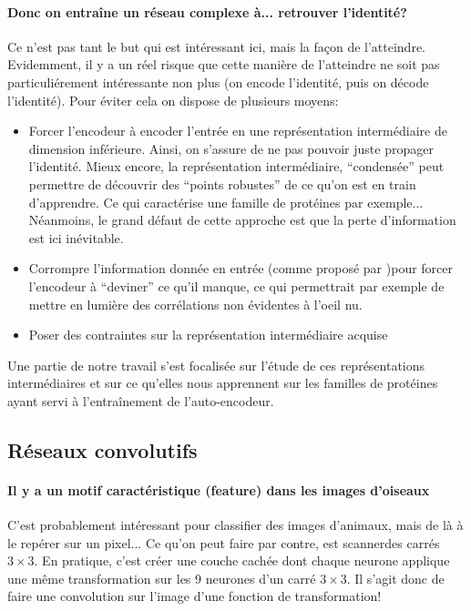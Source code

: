 \documentclass[a4paper,11pt]{article}
\begin{document}
\paragraph{Donc on entraîne un réseau complexe à... retrouver l'identité?}

Ce n'est pas tant le but qui est intéressant ici, mais la façon de l'atteindre.
Evidemment, il y a un réel risque que cette manière de l'atteindre ne soit pas
particuliérement intéressante non plus (on encode l'identité, puis on décode
l'identité). Pour éviter cela on dispose de plusieurs moyens:

\begin{itemize}
\item Forcer l'encodeur à encoder l'entrée en une représentation intermédiaire
  de dimension inférieure. Ainsi, on s'assure de ne pas pouvoir juste propager
  l'identité. Mieux encore, la représentation intermédiaire, ``condensée'' peut
  permettre de découvrir des ``points robustes'' de ce qu'on est en train
  d'apprendre. Ce qui caractérise une famille de protéines par exemple...
  Néanmoins, le grand défaut de cette approche est que la perte d'information
  est ici inévitable.
\item Corrompre l'information donnée en entrée (comme proposé par \cite{Vincent:2008:ECR:1390156.1390294})pour forcer l'encodeur à
  ``deviner'' ce qu'il manque, ce qui permettrait par exemple de mettre en
  lumière des corrélations non évidentes à l'oeil nu.
\item Poser des contraintes sur la représentation intermédiaire acquise

\end{itemize}

Une partie de notre travail s'est focalisée sur l'étude de ces représentations
intermédiaires et sur ce qu'elles nous apprennent sur les familles de protéines
ayant servi à l'entraînement de l'auto-encodeur.

\subsection{Réseaux convolutifs}

\paragraph{Il y a un motif caractéristique (feature) dans les images d'oiseaux}

C'est probablement intéressant pour classifier des images d'animaux, mais de là
à le repérer sur un pixel... Ce qu'on peut faire par contre, est \og
scanner\fg des carrés $3\times 3$. En pratique, c'est créer une couche cachée
dont chaque neurone applique une même transformation sur les 9 neurones d'un
carré $3\times 3$. Il s'agit donc de faire une convolution sur l'image d'une
fonction de transformation!
\end{document}
